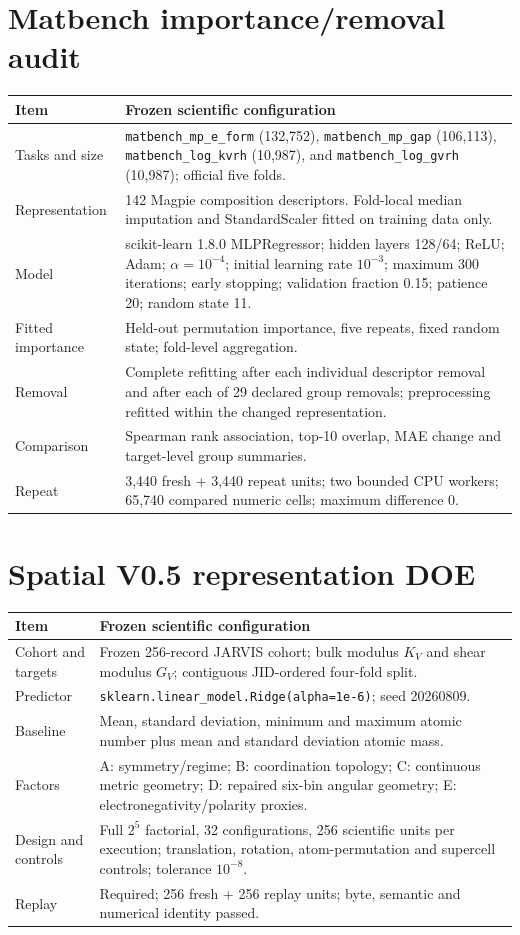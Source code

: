 \documentclass[11pt,a4paper,oneside]{report}
\begin{document}
\section*{Matbench importance/removal audit}
\begin{longtable}{p{}p{}}
\toprule Item & Frozen scientific configuration\\\midrule
Tasks and size & \texttt{matbench\_mp\_e\_form} (132,752), \texttt{matbench\_mp\_gap} (106,113), \texttt{matbench\_log\_kvrh} (10,987), and \texttt{matbench\_log\_gvrh} (10,987); official five folds.\\
Representation & 142 Magpie composition descriptors. Fold-local median imputation and StandardScaler fitted on training data only.\\
Model & scikit-learn 1.8.0 MLPRegressor; hidden layers 128/64; ReLU; Adam; $\alpha=10^{-4}$; initial learning rate $10^{-3}$; maximum 300 iterations; early stopping; validation fraction 0.15; patience 20; random state 11.\\
Fitted importance & Held-out permutation importance, five repeats, fixed random state; fold-level aggregation.\\
Removal & Complete refitting after each individual descriptor removal and after each of 29 declared group removals; preprocessing refitted within the changed representation.\\
Comparison & Spearman rank association, top-10 overlap, MAE change and target-level group summaries.\\
Repeat & 3,440 fresh + 3,440 repeat units; two bounded CPU workers; 65,740 compared numeric cells; maximum difference 0.\\
\bottomrule
\end{longtable}

\section*{Spatial V0.5 representation DOE}
\begin{longtable}{p{}p{}}
\toprule Item & Frozen scientific configuration\\\midrule
Cohort and targets & Frozen 256-record JARVIS cohort; bulk modulus $K_V$ and shear modulus $G_V$; contiguous JID-ordered four-fold split.\\
Predictor & \texttt{sklearn.linear\_model.Ridge(alpha=1e-6)}; seed 20260809.\\
Baseline & Mean, standard deviation, minimum and maximum atomic number plus mean and standard deviation atomic mass.\\
Factors & A: symmetry/regime; B: coordination topology; C: continuous metric geometry; D: repaired six-bin angular geometry; E: electronegativity/polarity proxies.\\
Design and controls & Full $2^5$ factorial, 32 configurations, 256 scientific units per execution; translation, rotation, atom-permutation and supercell controls; tolerance $10^{-8}$.\\
Replay & Required; 256 fresh + 256 replay units; byte, semantic and numerical identity passed.\\
\bottomrule
\end{longtable}
\end{document}
